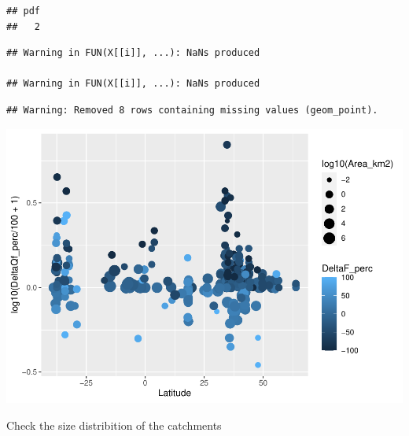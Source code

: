 \documentclass[]{elsarticle} %
\newenvironment{Shaded}{\begin{snugshade}}{\end{snugshade}}
\newcommand{\DataTypeTok}[1]{\textcolor[rgb]{0.13,0.29,0.53}{#1}}
\newcommand{\DecValTok}[1]{\textcolor[rgb]{0.00,0.00,0.81}{#1}}
\newcommand{\KeywordTok}[1]{\textcolor[rgb]{0.13,0.29,0.53}{\textbf{#1}}}
\newcommand{\NormalTok}[1]{#1}
\newcommand{\OperatorTok}[1]{\textcolor[rgb]{0.81,0.36,0.00}{\textbf{#1}}}
\newcommand{\StringTok}[1]{\textcolor[rgb]{0.31,0.60,0.02}{#1}}
\begin{document}
\begin{verbatim}
## pdf 
##   2
\end{verbatim}

\begin{Shaded}
\end{Shaded}

\begin{verbatim}
## Warning in FUN(X[[i]], ...): NaNs produced

## Warning in FUN(X[[i]], ...): NaNs produced
\end{verbatim}

\begin{verbatim}
## Warning: Removed 8 rows containing missing values (geom_point).
\end{verbatim}

\includegraphics{Forest_and_Water_files/figure-latex/unnamed-chunk-9-1.pdf}

Check the size distribition of the catchments

\begin{Shaded}
\end{Shaded}
\end{document}
